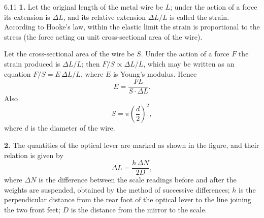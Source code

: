 \begin{hint}{6.11}
\textbf{1.} Let the original length of the metal wire be $L$; under the action of a force its extension is $\Delta L$, and its relative extension $\Delta L/L$ is called the strain. According to Hooke's law, within the elastic limit the strain is proportional to the stress (the force acting on unit cross-sectional area of the wire).

Let the cross-sectional area of the wire be $S$. Under the action of a force $F$ the strain produced is $\Delta L/L$; then $F/S\propto\Delta L/L$, which may be written as an equation $F/S=E\,\Delta L/L$, where $E$ is Young's modulus. Hence
\begin{equation*}
E=\frac{FL}{S\cdot\Delta L}.
\end{equation*}
Also
\begin{equation*}
S=\pi\left(\frac{d}{2}\right)^{2},
\end{equation*}
where $d$ is the diameter of the wire.

\textbf{2.} The quantities of the optical lever are marked as shown in the figure, and their relation is given by
\begin{equation*}
\Delta L=\frac{h\,\Delta N}{2D},
\end{equation*}
where $\Delta N$ is the difference between the scale readings before and after the weights are suspended, obtained by the method of successive differences; $h$ is the perpendicular distance from the rear foot of the optical lever to the line joining the two front feet; $D$ is the distance from the mirror to the scale.


\end{hint}
